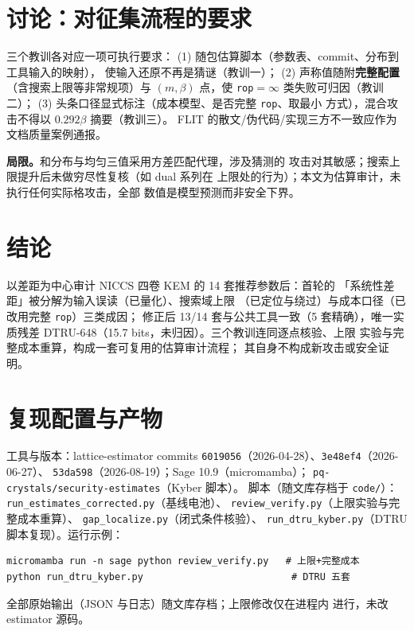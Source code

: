 \documentclass[11pt,a4paper,zihao=-4]{ctexart}
\newcommand{\code}[1]{\texttt{#1}}
\begin{document}
\section{讨论：对征集流程的要求}\label{sec:disc}

三个教训各对应一项可执行要求：
(1) 随包估算脚本（参数表、commit、分布到工具输入的映射），
使输入还原不再是猜谜（教训一）；
(2) 声称值随附\textbf{完整配置}（含搜索上限等非常规项）与
$(m,\beta)$ 点，使 \code{rop}$=\infty$ 类失败可归因（教训二）；
(3) 头条口径显式标注（成本模型、是否完整 \code{rop}、取最小
方式），混合攻击不得以 $0.292\beta$ 摘要（教训三）。
FLIT 的散文/伪代码/实现三方不一致应作为文档质量案例通报。

\textbf{局限。}和分布与均匀三值采用方差匹配代理，涉及猜测的
攻击对其敏感；搜索上限提升后未做穷尽性复核（如 dual 系列在
上限处的行为）；本文为估算审计，未执行任何实际格攻击，全部
数值是模型预测而非安全下界。

\section{结论}

以差距为中心审计 NICCS 四卷 KEM 的 14 套推荐参数后：首轮的
「系统性差距」被分解为输入误读（已量化）、搜索域上限
（已定位与绕过）与成本口径（已改用完整 \code{rop}）三类成因；
修正后 13/14 套与公共工具一致（5 套精确），唯一实质残差
DTRU-648（15.7 bits，未归因）。三个教训连同逐点核验、上限
实验与完整成本重算，构成一套可复用的估算审计流程；
其自身不构成新攻击或安全证明。

\section*{复现配置与产物}\label{sec:artifact}


\noindent 工具与版本：lattice-estimator commits
\code{6019056}（2026-04-28）、\code{3e48ef4}（2026-06-27）、
\code{53da598}（2026-08-19）；Sage 10.9（micromamba）；
\code{pq-crystals/security-estimates}（Kyber 脚本）。
脚本（随文库存档于 \code{code/}）：
\code{run\_estimates\_corrected.py}（基线电池）、
\code{review\_verify.py}（上限实验与完整成本重算）、
\code{gap\_localize.py}（闭式条件核验）、
\code{run\_dtru\_kyber.py}（DTRU 脚本复现）。运行示例：
\begin{verbatim}
micromamba run -n sage python review_verify.py   # 上限+完整成本
python run_dtru_kyber.py                          # DTRU 五套
\end{verbatim}
全部原始输出（JSON 与日志）随文库存档；上限修改仅在进程内
进行，未改 estimator 源码。
\end{document}
